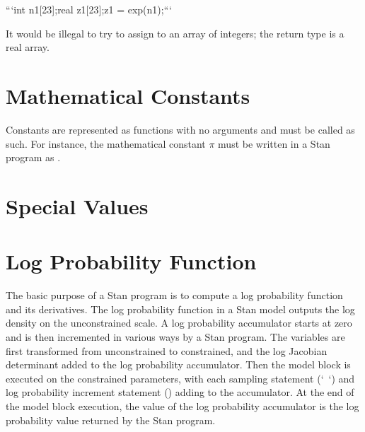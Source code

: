 \begin{description}
{```\n int n1[23];\n real z1[23];\n z1 = exp(n1);\n ```


It would be illegal to try to assign  to an array of integers; the return type is a real array.


\section{Mathematical Constants}\label{built-in-constants.section}


Constants are represented as functions with no arguments and must be called as such.  For instance, the mathematical constant $\pi$ must be written in a Stan program as .


\begin{description}      \end{description}


\section{Special Values}


\begin{description}     \end{description}


\section{Log Probability Function}\label{get-log-prob.section}


The basic purpose of a Stan program is to compute a log probability function and its derivatives.  The log probability function in a Stan model outputs the log density on the unconstrained scale.  A log probability accumulator starts at zero and is then incremented in various ways by a Stan program.  The variables are first transformed from unconstrained to constrained, and the log Jacobian determinant added to the log probability accumulator.  Then the model block is executed on the constrained parameters, with each sampling statement (`~`) and log probability increment statement () adding to the accumulator.  At the end of the model block execution, the value of the log probability accumulator is the log probability value returned by the Stan program.


}
\end{description}
